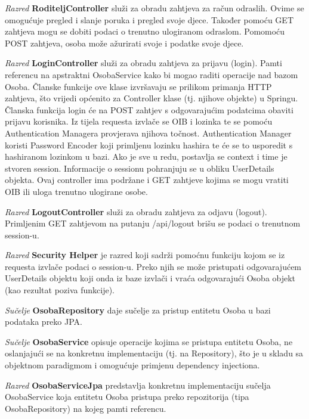 			 \textit{Razred }\textbf{RoditeljController}
			  služi za obradu zahtjeva za račun odraslih. Ovime se omogućuje pregled i slanje poruka i pregled svoje djece. Također pomoću GET zahtjeva mogu se dobiti podaci o trenutno ulogiranom odraslom. Pomomoću POST zahtjeva, osoba može ažurirati svoje i podatke svoje djece.
			  
			  \textit{Razred }\textbf{LoginController}
			  služi za obradu zahtjeva za prijavu (login).
			  Pamti referencu na apstraktni OsobaService kako bi mogao raditi operacije nad bazom Osoba.
			  Članske funkcije 
			  ove klase izvršavaju se prilikom primanja HTTP zahtjeva, što vrijedi općenito za Controller klase
			  (tj. njihove objekte) u Springu. Članska funkcija login će na POST zahtjev s odgovarajućim podatcima
			  obaviti prijavu korisnika. 
			  Iz tijela requesta izvlače se OIB i lozinka te se pomoću Authentication Managera provjerava njihova točnost. Authentication Manager koristi Password Encoder koji primljenu lozinku hashira te će se to usporedit s hashiranom lozinkom u bazi. Ako je sve u redu, postavlja se context i time je stvoren session. Informacije o sessionu pohranjuju se u obliku UserDetails objekta. Ovaj controller ima podržane i GET zahtjeve kojima se mogu vratiti OIB ili uloga trenutno ulogirane osobe.
			  
			  \textit{Razred }\textbf{LogoutController} služi za obradu zahtjeva za odjavu (logout). Primljenim GET zahtjevom na putanju /api/logout brišu se podaci o trenutnom session-u.
			  
			  \textit{Razred }\textbf{Security Helper} je razred koji sadrži pomoćnu funkciju kojom se iz requesta izvlače podaci o session-u. Preko njih se može pristupati odgovarajućem UserDetails objektu koji onda iz baze izvlači i vraća odgovarajući Osoba objekt (kao rezultat poziva funkcije).
			  
			  \textit{Sučelje }\textbf{OsobaRepository}
			  daje sučelje za pristup entitetu Osoba u bazi podataka preko JPA.
			  
			  \textit{Sučelje }\textbf{OsobaService}
			  opisuje operacije kojima se pristupa entitetu Osoba, 
			  ne oslanjajući se na konkretnu implementaciju (tj. na Repository),
			  što je u skladu sa objektnom paradigmom i omogućuje primjenu dependency injectiona.
			  
			  \textit{Razred }\textbf{OsobaServiceJpa}
			  predstavlja konkretnu implementaciju sučelja OsobaService koja entitetu Osoba
			  pristupa preko repozitorija (tipa OsobaRepository) na kojeg pamti referencu.
			  

